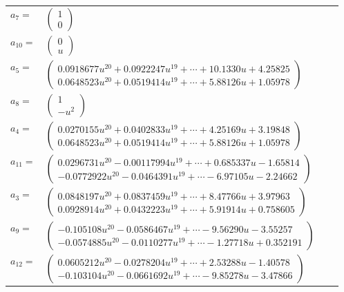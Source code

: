 \documentclass[1p]{elsarticle_modified}
\theoremstyle{definition}
\begin{document}
\begin{tabular}{m{7pt} m{180pt} m{7pt} m{180pt} }
\flushright $a_{7}=$&$\begin{pmatrix}1\\0\end{pmatrix}$ \\
\flushright $a_{10}=$&$\begin{pmatrix}0\\u\end{pmatrix}$ \\
\flushright $a_{5}=$&$\begin{pmatrix}0.0918677 u^{20}+0.0922247 u^{19}+\cdots+10.1330 u+4.25825\\0.0648523 u^{20}+0.0519414 u^{19}+\cdots+5.88126 u+1.05978\end{pmatrix}$ \\
\flushright $a_{8}=$&$\begin{pmatrix}1\\- u^2\end{pmatrix}$ \\
\flushright $a_{4}=$&$\begin{pmatrix}0.0270155 u^{20}+0.0402833 u^{19}+\cdots+4.25169 u+3.19848\\0.0648523 u^{20}+0.0519414 u^{19}+\cdots+5.88126 u+1.05978\end{pmatrix}$ \\
\flushright $a_{11}=$&$\begin{pmatrix}0.0296731 u^{20}-0.00117994 u^{19}+\cdots+0.685337 u-1.65814\\-0.0772922 u^{20}-0.0464391 u^{19}+\cdots-6.97105 u-2.24662\end{pmatrix}$ \\
\flushright $a_{3}=$&$\begin{pmatrix}0.0848197 u^{20}+0.0837459 u^{19}+\cdots+8.47766 u+3.97963\\0.0928914 u^{20}+0.0432223 u^{19}+\cdots+5.91914 u+0.758605\end{pmatrix}$ \\
\flushright $a_{9}=$&$\begin{pmatrix}-0.105108 u^{20}-0.0586467 u^{19}+\cdots-9.56290 u-3.55257\\-0.0574885 u^{20}-0.0110277 u^{19}+\cdots-1.27718 u+0.352191\end{pmatrix}$ \\
\flushright $a_{12}=$&$\begin{pmatrix}0.0605212 u^{20}-0.0278204 u^{19}+\cdots+2.53288 u-1.40578\\-0.103104 u^{20}-0.0661692 u^{19}+\cdots-9.85278 u-3.47866\end{pmatrix}$ \\

\end{tabular}
\end{document}
